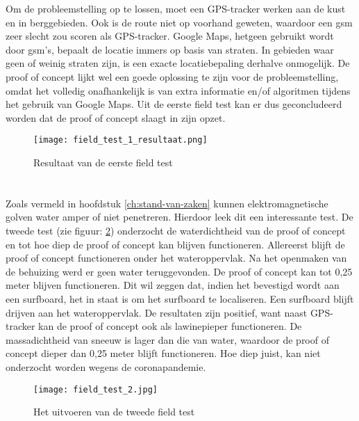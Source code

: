 Om de probleemstelling op te lossen, moet een GPS-tracker werken aan de kust en in berggebieden. Ook is de route niet op voorhand geweten, waardoor een gsm zeer slecht zou scoren als GPS-tracker. Google Maps, hetgeen gebruikt wordt door gsm's, bepaalt de locatie immers op basis van straten. In gebieden waar geen of weinig straten zijn, is een exacte locatiebepaling derhalve onmogelijk. De proof of concept lijkt wel een goede oplossing te zijn voor de probleemstelling, omdat het volledig onafhankelijk is van extra informatie en/of algoritmen tijdens het gebruik van Google Maps. 
\newline
Uit de eerste field test kan er dus geconcludeerd worden dat de proof of concept slaagt in zijn opzet.
\begin{figure}
	\texttt{[image: field\_test\_1\_resultaat.png]}
	\caption{Resultaat van de eerste field test}
	\label{fig:field_test_1_resultaat}
\end{figure}
\section{}
Zoals vermeld in hoofdstuk \ref{ch:stand-van-zaken} kunnen elektromagnetische golven water amper of niet penetreren. Hierdoor leek dit een interessante test.
\newline
De tweede test (zie figuur: \ref{fig:field_test_2}) onderzocht de waterdichtheid van de proof of concept en tot hoe diep de proof of concept kan blijven functioneren. Allereerst blijft de proof of concept functioneren onder het wateroppervlak. Na het openmaken van de behuizing werd er geen water teruggevonden.
\newline
De proof of concept kan tot 0,25 meter blijven functioneren. Dit wil zeggen dat, indien het bevestigd wordt aan een surfboard, het in staat is om het surfboard te localiseren. Een surfboard blijft drijven aan het wateroppervlak. De resultaten zijn positief, want naast GPS-tracker kan de proof of concept ook als lawinepieper functioneren. De massadichtheid van sneeuw is lager dan die van water, waardoor de proof of concept dieper dan 0,25 meter blijft functioneren. Hoe diep juist, kan niet onderzocht worden wegens de coronapandemie. 
\begin{figure}
	\texttt{[image: field\_test\_2.jpg]}
	\caption{Het uitvoeren van de tweede field test}
	\label{fig:field_test_2}
\end{figure}